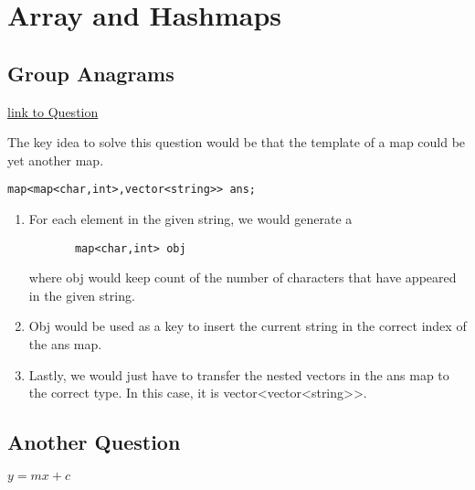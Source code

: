 \documentclass[11pt]{article}
\begin{document}
\section{Array and Hashmaps}
\subsection{Group Anagrams}
\href{https://leetcode.com/problems/group-anagrams/submissions/}{link to Question}

The key  idea to solve this question would be that the template of a map could be yet another map.

\begin {lstlisting}
map<map<char,int>,vector<string>> ans;
\end{lstlisting}
\begin{enumerate}
 \item {
       
       For each element in the given string, we would generate a
       \begin {lstlisting}
       map<char,int> obj
       \end{lstlisting}
       where obj would keep count of the number of characters that have appeared in the given string.
       }
       
       \item{
                   Obj would be used as a key to insert the current string in the correct index of the ans map.
             }
 \item {
       Lastly, we would just have to transfer the nested vectors in the ans map to the correct type.
       In this case, it is vector<vector<string>>.
       }
\end{enumerate}
\subsection{Another Question}
$y=mx+c$
\end{document}
